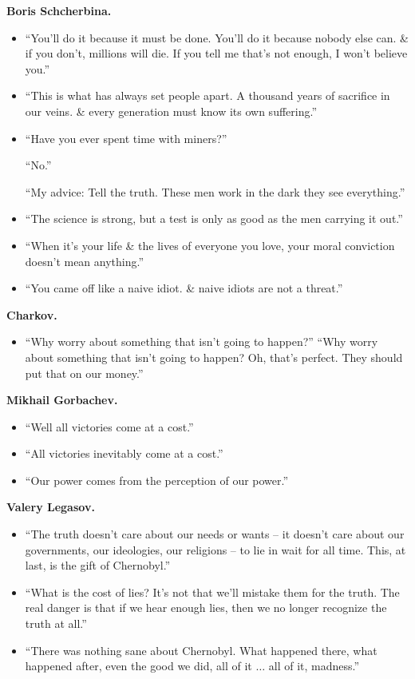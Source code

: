 \documentclass{article}
\begin{document}
\begin{enumerate}
	{\bf Boris Schcherbina.}
	\begin{itemize}
		\item ``You'll do it because it must be done. You'll do it because nobody else can. \& if you don't, millions will die. If you tell me that's not enough, I won't believe you.''
		\item ``This is what has always set people apart. A thousand years of sacrifice in our veins. \& every generation must know its own suffering.''
		\item ``Have you ever spent time with miners?''
		
		``No.''
		
		``My advice: Tell the truth. These men work in the dark they see everything.''
		\item ``The science is strong, but a test is only as good as the men carrying it out.''
		\item ``When it's your life \& the lives of everyone you love, your moral conviction doesn't mean anything.''
		\item ``You came off like a naive idiot. \& naive idiots are not a threat.''
	\end{itemize}
	{\bf Charkov.}
	\begin{itemize}
		\item ``Why worry about something that isn't going to happen?'' ``Why worry about something that isn't going to happen? Oh, that's perfect. They should put that on our money.''
	\end{itemize}
	{\bf Mikhail Gorbachev.}
	\begin{itemize}
		\item ``Well all victories come at a cost.''
		\item ``All victories inevitably come at a cost.''
		\item ``Our power comes from the perception of our power.''
	\end{itemize}
	{\bf Valery Legasov.}
	\begin{itemize}
		\item ``The truth doesn't care about our needs or wants -- it doesn't care about our governments, our ideologies, our religions -- to lie in wait for all time. This, at last, is the gift of Chernobyl.''
		\item ``What is the cost of lies? It's not that we'll mistake them for the truth. The real danger is that if we hear enough lies, then we no longer recognize the truth at all.''
		\item ``There was nothing sane about Chernobyl. What happened there, what happened after, even the good we did, all of it $\ldots$ all of it, madness.''

\end{itemize}
\end{enumerate}
\end{document}
